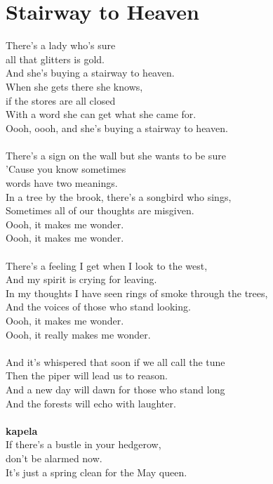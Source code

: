 \section{Stairway to Heaven}
There's a lady who's sure \\
all that glitters is gold.\\
And she's buying a stairway to heaven.\\
When she gets there she knows, \\
if the stores are all closed\\
With a word she can get what she came for.\\
Oooh, oooh, and she's buying a stairway to heaven.\\
\\
There's a sign on the wall but she wants to be sure\\
'Cause you know sometimes\\
words have two meanings.\\
In a tree by the brook, there's a songbird who sings,\\
Sometimes all of our thoughts are misgiven.\\
Oooh, it makes me wonder.\\
Oooh, it makes me wonder.\\
\\
There's a feeling I get when I look to the west,\\
And my spirit is crying for leaving.\\
In my thoughts I have seen rings of smoke through the trees,\\
And the voices of those who stand looking.\\
Oooh, it makes me wonder.\\
Oooh, it really makes me wonder.\\
\\
And it's whispered that soon if we all call the tune\\
Then the piper will lead us to reason.\\
And a new day will dawn for those who stand long\\
And the forests will echo with laughter.\\
\\
\textbf{kapela}
\\
If there's a bustle in your hedgerow, \\
don't be alarmed now.\\
It's just a spring clean for the May queen.\\
